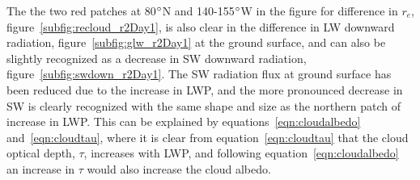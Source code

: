 The the two red patches at 80$\degree$N and 140-155$\degree$W in the figure for difference in $r_e$, figure~\ref{subfig:recloud_r2Day1}, is also clear in the difference in LW downward radiation, figure~\ref{subfig:glw_r2Day1} at the ground surface, and can also be slightly recognized as a decrease in SW downward radiation, figure~\ref{subfig:swdown_r2Day1}. The SW radiation flux at ground surface has been reduced due to the increase in LWP, and the more pronounced decrease in SW is clearly recognized with the same shape and size as the northern patch of increase in LWP. This can be explained by equations~\ref{eqn:cloudalbedo} and~\ref{eqn:cloudtau}, where it is clear from equation~\ref{eqn:cloudtau} that the cloud optical depth, $\tau$, increases with LWP, and following equation~\ref{eqn:cloudalbedo} an increase in $\tau$ would also increase the cloud albedo.

